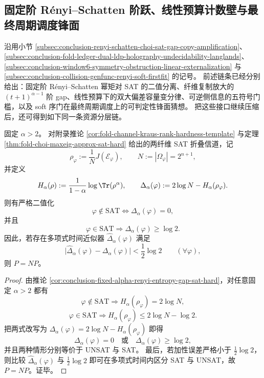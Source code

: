 \subsection{固定阶 Rényi--Schatten 阶跃、线性预算计数壁与最终周期调度锋面}\label{subsec:conclusion-renyi-schatten-budget-alphabet-schedule-frontier}
沿用小节 \ref{subsec:conclusion-renyi-schatten-choi-sat-gap-copy-amplification}、
\ref{subsec:conclusion-fold-ledger-dual-ldp-holography-undecidability-langlands}、
\ref{subsec:conclusion-window6-symmetry-obstruction-linear-externalization}
与 \ref{subsec:conclusion-collision-genfunc-renyi-soft-firstfit} 的记号。
前述链条已经分别给出：固定阶 Rényi--Schatten 幂矩对 SAT 的二值分离、纤维复制放大的 \((t+1)^{\alpha-1}\) 阶 gap、线性预算下的双大偏差容量变分律、可逆侧信息的五符号门槛，以及 soft 序门在最终周期调度上的可判定性锋面猜想。
把这些接口继续压缩后，还可得到如下同一条资源分层链。

\begin{theorem}\label{thm:conclusion-renyi-schatten-gap-rigid-onebit-sat-order-parameter}
固定 \(\alpha>2\)。
对附录推论 \ref{cor:fold-channel-kraus-rank-hardness-template} 与定理 \ref{thm:fold-choi-maxeig-approx-sat-hard} 给出的两纤维 SAT 折叠信道，记
\[
\rho_\varphi:=\frac{1}{N}J(\mathcal E_\varphi),
\qquad
N:=|\Omega_\varphi|=2^{n+1},
\]
并定义
\[
H_\alpha(\rho):=\frac{1}{1-\alpha}\log\Tr(\rho^\alpha),
\qquad
\Delta_\alpha(\varphi):=2\log N-H_\alpha(\rho_\varphi).
\]
则有严格二值化
\[
\varphi\notin \mathrm{SAT}
\iff
\Delta_\alpha(\varphi)=0,
\]
并且
\[
\varphi\in \mathrm{SAT}
\Longrightarrow
\Delta_\alpha(\varphi)\ge \log 2.
\]
因此，若存在多项式时间近似器 \(\widehat\Delta_\alpha(\varphi)\) 满足
\[
\bigl|\widehat\Delta_\alpha(\varphi)-\Delta_\alpha(\varphi)\bigr|<\frac12\log 2
\qquad(\forall \varphi),
\]
则 \(P=NP\)。
\end{theorem}
\begin{proof}
由推论 \ref{cor:conclusion-fixed-alpha-renyi-entropy-gap-sat-hard}，对任意固定 \(\alpha>2\) 都有
\[
\varphi\notin \mathrm{SAT}
\Longrightarrow
H_\alpha(\rho_\varphi)=2\log N,
\]
\[
\varphi\in \mathrm{SAT}
\Longrightarrow
H_\alpha(\rho_\varphi)\le 2\log N-\log 2.
\]
把两式改写为 \(\Delta_\alpha(\varphi)=2\log N-H_\alpha(\rho_\varphi)\) 即得
\[
\Delta_\alpha(\varphi)=0
\quad\text{或}\quad
\Delta_\alpha(\varphi)\ge \log 2,
\]
并且两种情形分别等价于 UNSAT 与 SAT。
最后，若加性误差严格小于 \(\frac12\log 2\)，则比较 \(\widehat\Delta_\alpha(\varphi)\) 与 \(\frac12\log 2\) 即可在多项式时间内区分 SAT 与 UNSAT，故 \(P=NP\)。证毕。
\end{proof}

